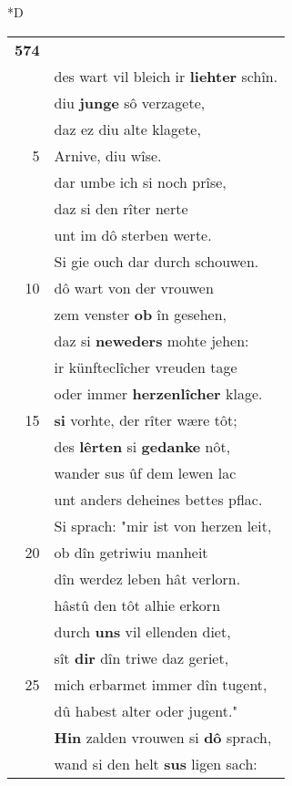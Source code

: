 \documentclass[8pt,a4paper,notitlepage]{article}
\begin{document}
\begin{table}[ht]
\begin{minipage}[t]{0.5\linewidth}
\small
\begin{center}*D
\end{center}
\begin{tabular}{rl}
\textbf{574} & \textit{\begin{large}M\end{large}}it vorhten luogete \textbf{oben} în;\\ 
 & des wart vil bleich ir \textbf{liehter} schîn.\\ 
 & diu \textbf{junge} sô verzagete,\\ 
 & daz ez diu alte klagete,\\ 
5 & Arnive, diu wîse.\\ 
 & dar umbe ich si noch prîse,\\ 
 & daz si den rîter nerte\\ 
 & unt im dô sterben werte.\\ 
 & Si gie ouch dar durch schouwen.\\ 
10 & dô wart von der vrouwen\\ 
 & zem venster \textbf{ob} în gesehen,\\ 
 & daz si \textbf{neweders} mohte jehen:\\ 
 & ir künfteclîcher vreuden tage\\ 
 & oder immer \textbf{herzenlîcher} klage.\\ 
15 & \textbf{si} vorhte, der rîter wære tôt;\\ 
 & des \textbf{lêrten} si \textbf{gedanke} nôt,\\ 
 & wander sus ûf dem lewen lac\\ 
 & unt anders deheines bettes pflac.\\ 
 & Si sprach: "mir ist von herzen leit,\\ 
20 & ob dîn getriwiu manheit\\ 
 & dîn werdez leben hât verlorn.\\ 
 & hâstû den tôt alhie erkorn\\ 
 & durch \textbf{uns} vil ellenden diet,\\ 
 & sît \textbf{dir} dîn triwe daz geriet,\\ 
25 & mich erbarmet immer dîn tugent,\\ 
 & dû habest alter oder jugent."\\ 
 & \textbf{Hin} zalden vrouwen si \textbf{dô} sprach,\\ 
 & wand si den helt \textbf{sus} ligen sach:\\ 

\end{tabular}
\end{minipage}
\end{table}
\end{document}
